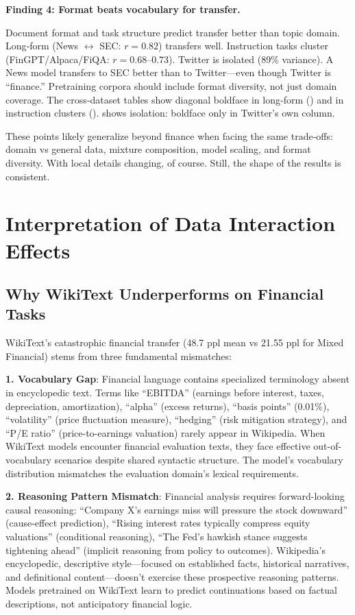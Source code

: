 \textbf{Finding 4: Format beats vocabulary for transfer.}

Document format and task structure predict transfer better than topic domain. Long‑form (News $\leftrightarrow$ SEC: $r = 0.82$) transfers well. Instruction tasks cluster (FinGPT/Alpaca/FiQA: $r = 0.68$–$0.73$). Twitter is isolated (89\% variance). A News model transfers to SEC better than to Twitter—even though Twitter is “finance.” Pretraining corpora should include format diversity, not just domain coverage. The cross‑dataset tables show diagonal boldface in long‑form () and in instruction clusters ().  shows isolation: boldface only in Twitter’s own column.

These points likely generalize beyond finance when facing the same trade‑offs: domain vs general data, mixture composition, model scaling, and format diversity. With local details changing, of course. Still, the shape of the results is consistent.

\section{Interpretation of Data Interaction Effects}

\subsection{Why WikiText Underperforms on Financial Tasks}

WikiText's catastrophic financial transfer (48.7 ppl mean vs 21.55 ppl for Mixed Financial) stems from three fundamental mismatches:

\textbf{1. Vocabulary Gap}: Financial language contains specialized terminology absent in encyclopedic text. Terms like ``EBITDA'' (earnings before interest, taxes, depreciation, amortization), ``alpha'' (excess returns), ``basis points'' (0.01\%), ``volatility'' (price fluctuation measure), ``hedging'' (risk mitigation strategy), and ``P/E ratio'' (price-to-earnings valuation) rarely appear in Wikipedia. When WikiText models encounter financial evaluation texts, they face effective out-of-vocabulary scenarios despite shared syntactic structure. The model's vocabulary distribution mismatches the evaluation domain's lexical requirements.

\textbf{2. Reasoning Pattern Mismatch}: Financial analysis requires forward-looking causal reasoning: ``Company X's earnings miss will pressure the stock downward'' (cause-effect prediction), ``Rising interest rates typically compress equity valuations'' (conditional reasoning), ``The Fed's hawkish stance suggests tightening ahead'' (implicit reasoning from policy to outcomes). Wikipedia's encyclopedic, descriptive style—focused on established facts, historical narratives, and definitional content—doesn't exercise these prospective reasoning patterns. Models pretrained on WikiText learn to predict continuations based on factual descriptions, not anticipatory financial logic.


